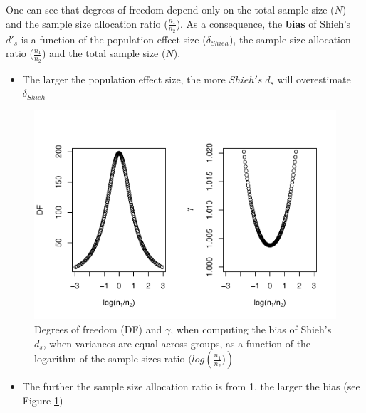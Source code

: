 \documentclass[
  man]{apa6}
\providecommand{\tightlist}{%
  \setlength{\itemsep}{0pt}\setlength{\parskip}{0pt}}
\begin{document}
One can see that degrees of freedom depend only on the total sample size (\(N\)) and the sample size allocation ratio (\(\frac{n_1}{n_2}\)). As a consequence, the \textbf{bias} of Shieh's \(d'_s\) is a function of the population effect size (\(\delta_{Shieh}\)), the sample size allocation ratio (\(\frac{n_1}{n_2}\)) and the total sample size (\(N\)).

\begin{itemize}
\tightlist
\item
  The larger the population effect size, the more \(Shieh's \; d_s\) will overestimate \(\delta_{Shieh}\)
\end{itemize}

\begin{figure}
\centering
\includegraphics{Theoretical-Bias-of-all-estimators-as-a-function-of-population-parameters_files/figure-latex/biasshiehhomNratio2-1.pdf}
\caption{\label{fig:biasshiehhomNratio2}Degrees of freedom (DF) and \(\gamma\), when computing the bias of Shieh's \(d_s\), when variances are equal across groups, as a function of the logarithm of the sample sizes ratio \((log \left(\frac{n_1}{n_2})\right)\)}
\end{figure}

\begin{itemize}
\tightlist
\item
  The further the sample size allocation ratio is from 1, the larger the bias (see Figure \ref{fig:biasshiehhomNratio2})
\end{itemize}
\end{document}
